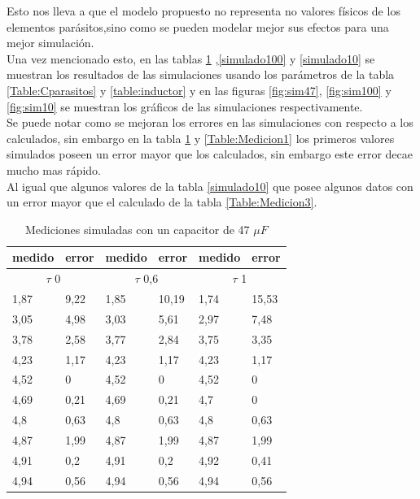 \documentclass[journal]{IEEEtran}
\begin{document}
Esto nos lleva a que el modelo propuesto no representa no valores físicos de los elementos parásitos,sino como se pueden modelar mejor sus efectos para una mejor simulación.\\ Una vez mencionado esto, en las tablas \ref{simulado47} ,\ref{simulado100} y \ref{simulado10} se muestran los resultados de las simulaciones usando los parámetros de la tabla \ref{Table:Cparasitos} y \ref{table:inductor} y en las figuras \ref{fig:sim47}, \ref{fig:sim100} y \ref{fig:sim10} se muestran los gráficos de las simulaciones respectivamente.\\ Se puede notar como se mejoran los errores en las simulaciones con respecto a los calculados, sin embargo en la tabla \ref{simulado47} y \ref{Table:Medicion1} los primeros valores simulados poseen un error mayor que los calculados, sin embargo este error decae mucho mas rápido.\\ Al igual que algunos valores de la tabla \ref{simulado10} que posee algunos datos con un error mayor que el calculado de la tabla \ref{Table:Medicion3}.\\
\begin{table}[]
	\centering
	\caption{Mediciones simuladas con un capacitor de 47 \(\mu F\)}
	\label{simulado47}
	\begin{tabular}{|l|l|l|l|l|l|}
		\hline
		medido          & error          & medido           & error          & medido          & error         \\ \hline
		\multicolumn{2}{|c|}{\(\tau\) 0} & \multicolumn{2}{c|}{\(\tau\) 0,6} & \multicolumn{2}{c|}{\(\tau\) 1} \\ \hline
		1,87            & 9,22           & 1,85             & 10,19          & 1,74            & 15,53         \\ \hline
		3,05            & 4,98           & 3,03             & 5,61           & 2,97            & 7,48          \\ \hline
		3,78            & 2,58           & 3,77             & 2,84           & 3,75            & 3,35          \\ \hline
		4,23            & 1,17           & 4,23             & 1,17           & 4,23            & 1,17          \\ \hline
		4,52            & 0              & 4,52             & 0              & 4,52            & 0             \\ \hline
		4,69            & 0,21           & 4,69             & 0,21           & 4,7             & 0             \\ \hline
		4,8             & 0,63           & 4,8              & 0,63           & 4,8             & 0,63          \\ \hline
		4,87            & 1,99           & 4,87             & 1,99           & 4,87            & 1,99          \\ \hline
		4,91            & 0,2            & 4,91             & 0,2            & 4,92            & 0,41          \\ \hline
		4,94            & 0,56           & 4,94             & 0,56           & 4,94            & 0,56          \\ \hline
	\end{tabular}
\end{table}
\end{document}
